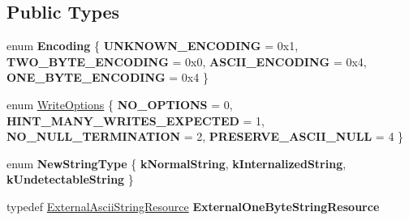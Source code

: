 \subsection*{Public Types}
\begin{DoxyCompactItemize}
\item 
\hypertarget{classv8_1_1_string_a2f4a2e9516c246eef602b889ce049c49}{}enum {\bfseries Encoding} \{ {\bfseries U\+N\+K\+N\+O\+W\+N\+\_\+\+E\+N\+C\+O\+D\+I\+N\+G} = 0x1, 
{\bfseries T\+W\+O\+\_\+\+B\+Y\+T\+E\+\_\+\+E\+N\+C\+O\+D\+I\+N\+G} = 0x0, 
{\bfseries A\+S\+C\+I\+I\+\_\+\+E\+N\+C\+O\+D\+I\+N\+G} = 0x4, 
{\bfseries O\+N\+E\+\_\+\+B\+Y\+T\+E\+\_\+\+E\+N\+C\+O\+D\+I\+N\+G} = 0x4
 \}\label{classv8_1_1_string_a2f4a2e9516c246eef602b889ce049c49}

\item 
enum \hyperlink{classv8_1_1_string_a9ce7f1458ffd08f8eb2b9c8dc056e616}{Write\+Options} \{ {\bfseries N\+O\+\_\+\+O\+P\+T\+I\+O\+N\+S} = 0, 
{\bfseries H\+I\+N\+T\+\_\+\+M\+A\+N\+Y\+\_\+\+W\+R\+I\+T\+E\+S\+\_\+\+E\+X\+P\+E\+C\+T\+E\+D} = 1, 
{\bfseries N\+O\+\_\+\+N\+U\+L\+L\+\_\+\+T\+E\+R\+M\+I\+N\+A\+T\+I\+O\+N} = 2, 
{\bfseries P\+R\+E\+S\+E\+R\+V\+E\+\_\+\+A\+S\+C\+I\+I\+\_\+\+N\+U\+L\+L} = 4
 \}
\item 
\hypertarget{classv8_1_1_string_a37620fb9fdc9b72ec9eea2a2aafaddee}{}enum {\bfseries New\+String\+Type} \{ {\bfseries k\+Normal\+String}, 
{\bfseries k\+Internalized\+String}, 
{\bfseries k\+Undetectable\+String}
 \}\label{classv8_1_1_string_a37620fb9fdc9b72ec9eea2a2aafaddee}

\item 
\hypertarget{classv8_1_1_string_aefa36d4416f7f2b0c415dfa2d225e728}{}typedef \hyperlink{classv8_1_1_string_1_1_external_ascii_string_resource}{External\+Ascii\+String\+Resource} {\bfseries External\+One\+Byte\+String\+Resource}\label{classv8_1_1_string_aefa36d4416f7f2b0c415dfa2d225e728}

\end{DoxyCompactItemize}
